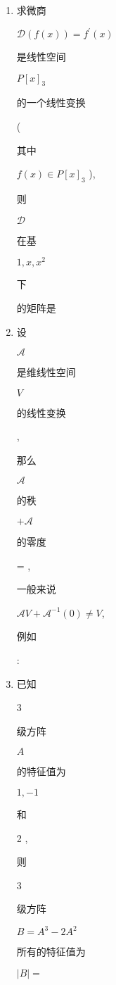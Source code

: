 \documentclass[10pt]{article}
\begin{document}
\begin{enumerate}
  \item \begin{CJK}{UTF8}{mj}求微商\end{CJK} $\mathscr{D}(f(x))=f^{\prime}(x)$ \begin{CJK}{UTF8}{mj}是线性空间\end{CJK} $P[x]_{3}$ \begin{CJK}{UTF8}{mj}的一个线性变换\end{CJK} (\begin{CJK}{UTF8}{mj}其中\end{CJK} $f(x) \in P[x]_{3}$ ), \begin{CJK}{UTF8}{mj}则\end{CJK} $\mathscr{D}$ \begin{CJK}{UTF8}{mj}在基\end{CJK} $1, x, x^{2}$ \begin{CJK}{UTF8}{mj}下\end{CJK} \begin{CJK}{UTF8}{mj}的矩阵是\end{CJK}

  \item \begin{CJK}{UTF8}{mj}设\end{CJK} $\mathscr{A}$ \begin{CJK}{UTF8}{mj}是维线性空间\end{CJK} $V$ \begin{CJK}{UTF8}{mj}的线性变换\end{CJK}, \begin{CJK}{UTF8}{mj}那么\end{CJK} $\mathscr{A}$ \begin{CJK}{UTF8}{mj}的秩\end{CJK} $+\mathscr{A}$ \begin{CJK}{UTF8}{mj}的零度\end{CJK}= ,\begin{CJK}{UTF8}{mj}一般来说\end{CJK} $\mathscr{A} V+\mathscr{A}^{-1}(0) \neq V$, \begin{CJK}{UTF8}{mj}例如\end{CJK}:

  \item \begin{CJK}{UTF8}{mj}已知\end{CJK} 3 \begin{CJK}{UTF8}{mj}级方阵\end{CJK} $A$ \begin{CJK}{UTF8}{mj}的特征值为\end{CJK} $1,-1$ \begin{CJK}{UTF8}{mj}和\end{CJK} 2 , \begin{CJK}{UTF8}{mj}则\end{CJK} 3 \begin{CJK}{UTF8}{mj}级方阵\end{CJK} $B=A^{3}-2 A^{2}$ \begin{CJK}{UTF8}{mj}所有的特征值为\end{CJK} $|B|=$

\end{enumerate}
\end{document}
